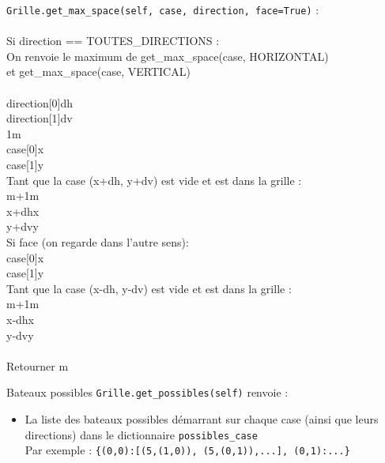 {
\begin{frame}[allowframebreaks]
\texttt{Grille.get\_max\_space(self, case, direction, face=True)} : \\~\\
Si direction == TOUTES\_DIRECTIONS :\\
 On renvoie le maximum de get\_max\_space(case, HORIZONTAL)\\
 et get\_max\_space(case, VERTICAL)\\~\\
direction[0]\sto dh\\
direction[1]\sto dv\\
1\sto m\\
\framebreak
case[0]\sto x\\
case[1]\sto y\\
Tant que la case (x+dh, y+dv) est vide et est dans la grille :\\
m+1\sto m\\
x+dh\sto x\\
y+dv\sto y\\
\framebreak
Si face (on regarde dans l'autre sens):\\
case[0]\sto x\\
case[1]\sto y\\
Tant que la case (x-dh, y-dv) est vide et est dans la grille :\\
m+1\sto m\\
x-dh\sto x\\
y-dv\sto y\\~\\
Retourner m\\
\end{frame}
}

\begin{frame}{Bateaux possibles}
\texttt{Grille.get\_possibles(self)} renvoie :
\begin{itemize}
\item La liste des bateaux possibles démarrant sur chaque case (ainsi que leurs directions) dans le dictionnaire \texttt{possibles\_case}\\
Par exemple : \texttt{\{(0,0):[(5,(1,0)), (5,(0,1)),...], (0,1):...\}}
\end{itemize}
\end{frame}

